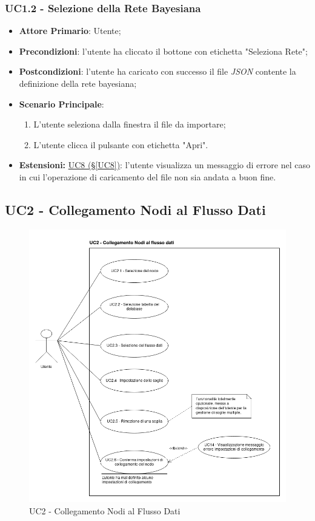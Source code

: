 \subsubsection{UC1.2 - Selezione della Rete Bayesiana}\label{UC1.2}
\begin{itemize}
	\item \textbf{Attore Primario}: Utente;
	\item \textbf{Precondizioni}: l'utente ha cliccato il bottone con etichetta "Seleziona Rete";
	\item \textbf{Postcondizioni}: l'utente ha caricato con successo il file \textit{JSON} contente la definizione della rete bayesiana;
	\item \textbf{Scenario Principale}:
	\begin{enumerate}
		\item L'utente seleziona dalla finestra il file da importare;
		\item L'utente clicca il pulsante con etichetta "Apri".
	\end{enumerate}
	\item \textbf{Estensioni:} \hyperref[UC8]{UC8 (§\ref*{UC8})}: l'utente visualizza un messaggio di errore nel caso in cui l'operazione di caricamento del file non sia andata a buon fine.
\end{itemize}

\pagebreak

\subsection{UC2 - Collegamento Nodi al Flusso Dati}\label{UC2}
\begin{figure}[H]
\centering
\includegraphics[scale=0.5]{./images/UC2.png}
\caption{UC2 - Collegamento Nodi al Flusso Dati}
\end{figure}

